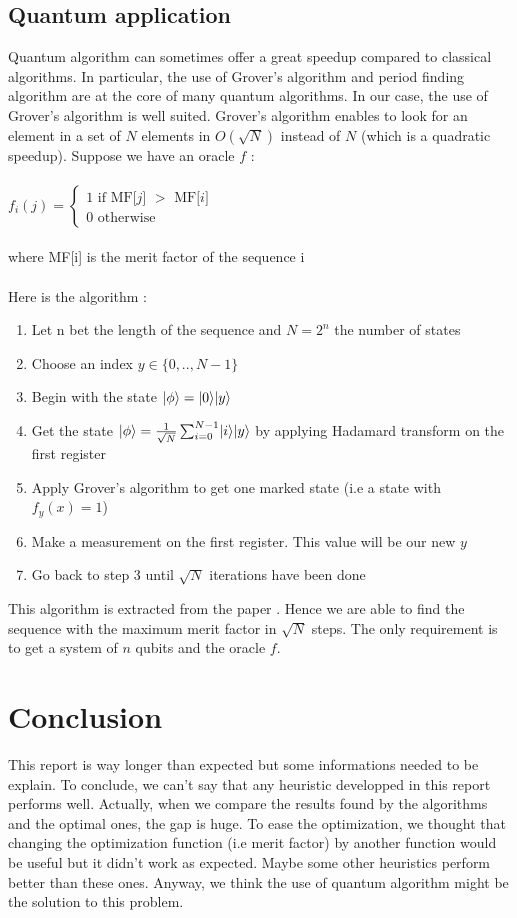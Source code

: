 \documentclass[a4paper,11pt,openany]{article}
\begin{document}
\subsection{Quantum application}
\DeclarePairedDelimiter\bra{\langle}{\rvert}
\DeclarePairedDelimiter\ket{\lvert}{\rangle}
\noindent
Quantum algorithm can sometimes offer a great speedup compared to classical algorithms. In particular, the use of Grover's algorithm \cite{search} and period finding algorithm are at the core of many quantum algorithms. In our case, the use of Grover's algorithm is well suited. Grover's algorithm enables to look for an element in a set of $N$ elements in $O(\sqrt{N})$ instead of $N$ (which is a quadratic speedup).
Suppose we have an oracle $f$ :\\\\
$f_i(j)=\left\{
\begin{array}{l}
  1 \text{ if MF[$j$] $>$ MF[$i$]} \\
  0 \text{ otherwise}
\end{array}
\right.$\\\\
where MF[i] is the merit factor of the sequence i\\\\
Here is the algorithm :
\begin{enumerate}
\item Let n bet the length of the sequence and $N=2^n$ the number of states
\item Choose an index $y \in \{0,..,N-1\}$
\item Begin with the state $\ket{\phi}=\ket{0}\ket{y}$
\item Get the state $\ket{\phi}=\frac{1}{\sqrt{N}}\sum_{i=0}^{N-1}\ket{i}\ket{y}$ by applying Hadamard transform on the first register
\item Apply Grover's algorithm to get one marked state (i.e a state with $f_y(x)=1$)
\item Make a measurement on the first register. This value will be our new $y$
\item Go back to step 3 until $\sqrt{N}$ iterations have been done
\end{enumerate}
This algorithm is extracted from the paper \cite{max_quantum}. Hence we are able to find the sequence with the maximum merit factor in $\sqrt{N}$ steps. The only requirement is to get a system of $n$ qubits and the oracle $f$.
\section{Conclusion}
\noindent
This report is way longer than expected but some informations needed to be explain. To conclude, we can't say that any heuristic developped in this report performs well. Actually, when we compare the results found by the algorithms and the optimal ones, the gap is huge. To ease the optimization, we thought that changing the optimization function (i.e merit factor) by another function would be useful but it didn't work as expected. Maybe some other heuristics perform better than these ones. Anyway, we think the use of quantum algorithm might be the solution to this problem.
\end{document}
